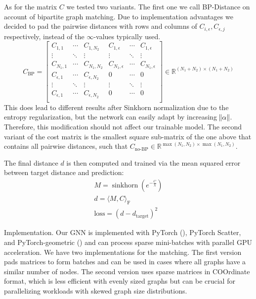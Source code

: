 As for the matrix $C$ we tested two variants. The first one we call BP-Distance on account of bipartite graph matching. Due to implementation advantages we decided to pad the pairwise distances with rows and columns of $C_{i, \epsilon}, C_{\epsilon, j}$ respectively, instead of the $\infty$-values typically used.
\begin{equation}
     C_\text{BP}=
          \left[
          \begin{array}{ccc|ccc}
               C_{1,1} & \dotsi & C_{1, N_2} & C_{1, \epsilon} & \dotsi & C_{1, \epsilon} \\
               \vdots & \ddots & \vdots & \vdots & \ddots & \vdots \\
               C_{N_1, 1} & \dotsi & C_{N_1, N_2} & C_{N_1, \epsilon} & \dotsi & C_{N_1, \epsilon} \\
               \hline
               C_{\epsilon, 1} & \dotsi & C_{\epsilon, N_2} & 0 & \dotsi & 0 \\
               \vdots & \ddots & \vdots & \vdots & \ddots & \vdots \\
               C_{\epsilon, 1} & \dotsi & C_{\epsilon, N_2} & 0 & \dotsi & 0 \\
          \end{array}
          \right]
     \in \mathbb{R}^{(N_1 + N_2) \times (N_1 + N_2)}
\end{equation}
This does lead to different results after Sinkhorn normalization due to the entropy regularization, but the network can easily adapt by increasing $\norm{\alpha}$. Therefore, this modification should not affect our trainable model. The second variant of the cost matrix is the smallest square sub-matrix of the one above that contains all pairwise distances, such that \mbox{$C_\text{no-BP} \in \mathbb{R}^{\max({N_1, N_2}) \times \max({N_1, N_2})}$}.

The final distance $d$ is then computed and trained via the mean squared error between target distance and prediction:
\begin{equation}
     \begin{gathered}
          M = \operatorname{sinkhorn}\left(e^{-\frac{C}{\lambda}}\right) \\
          d = \langle M, C \rangle_\mathrm{F} \\
          \text{loss} = (d - d_\text{target})^2
     \end{gathered}
\end{equation}

Implementation. Our GNN is implemented with PyTorch (\citealp{pytorch}), PyTorch Scatter, and PyTorch-geometric (\citealp{pytorchgeometric}) and can process sparse mini-batches with parallel GPU acceleration. We have two implementations for the matching. The first version pads matrices to form batches and can be used in cases where all graphs have a similar number of nodes. The second version uses sparse matrices in COOrdinate format, which is less efficient with evenly sized graphs but can be crucial for parallelizing workloads with skewed graph size distributions.



